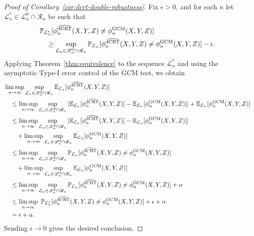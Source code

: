 \documentclass[aos]{imsart}
\theoremstyle{plain}
\theoremstyle{remark}
\newcommand{\E}{\mathbb E}								%
\renewcommand{\P}{\mathbb{P}}							%
\newcommand{\srx}{X}									%
\newcommand{\srz}{Z}									%
\newcommand{\sry}{Y}									%
\newcommand{\law}{\mathcal L}							%
\newcommand{\nulllaws}{\mathscr L^0}					%
\newcommand{\regclass}{\mathscr R}					    %
\newcommand{\GCM}{\textnormal{GCM}}						%
\newcommand{\dCRThat}{\widehat{\textnormal{dCRT}}}		%
\begin{document}
\begin{proof}[Proof of Corollary~\ref{cor:dcrt-double-robustness}] 
Fix $\epsilon > 0$, and for each $n$ let $\law^*_n \in \nulllaws_n \cap \regclass_n$ be such that
\begin{align*}
&\P_{\law^*_n}[\phi_n^{\dCRThat}(\srx, \sry, \srz) \neq \phi_n^{\GCM}(\srx, \sry, \srz)] \\
&\quad\geq \sup_{\law_n \in \nulllaws_n \cap \regclass_n} \P_{\law_n}[\phi_n^{\dCRThat}(\srx, \sry, \srz) \neq \phi_n^{\GCM}(\srx, \sry, \srz)] - \epsilon.
\end{align*}
Applying Theorem~\ref{thm:equivalence} to the sequence $\law^*_n$ and using the asymptotic Type-I error control of the GCM test, we obtain
\begin{equation*}
\begin{split}
&\limsup_{n \rightarrow \infty} \sup_{\law_n \in \nulllaws_n \cap \regclass_n} \E_{\law_n}[\phi_n^{\dCRThat}(\srx, \sry, \srz)] \\
&\quad\leq \limsup_{n \rightarrow \infty} \sup_{\law_n \in \nulllaws_n \cap \regclass_n} |\E_{\law_n}[\phi_n^{\dCRThat}(\srx, \sry, \srz)] - \E_{\law_n}[\phi_n^{\GCM}(\srx, \sry, \srz)]| + \E_{\law_n}[\phi_n^{\GCM}(\srx, \sry, \srz)] \\
&\quad\leq \limsup_{n \rightarrow \infty} \sup_{\law_n \in \nulllaws_n \cap  \regclass_n} |\E_{\law_n}[\phi_n^{\dCRThat}(\srx, \sry, \srz)] - \E_{\law_n}[\phi_n^{\GCM}(\srx, \sry, \srz)]| \\
&\quad \quad + \limsup_{n \rightarrow \infty} \sup_{\law_n \in \nulllaws_n \cap \regclass_n} \E_{\law_n}[\phi_n^{\GCM}(\srx, \sry, \srz)] \\
&\quad\leq \limsup_{n \rightarrow \infty} \sup_{\law_n \in \nulllaws_n \cap  \regclass_n} \P_{\law_n}[\phi_n^{\dCRThat}(\srx, \sry, \srz) \neq \phi_n^{\GCM}(\srx, \sry, \srz)]  \\
&\quad \quad + \limsup_{n \rightarrow \infty} \sup_{\law_n \in \nulllaws_n \cap \regclass_n} \E_{\law_n}[\phi_n^{\GCM}(\srx, \sry, \srz)] \\
&\quad\leq \limsup_{n \rightarrow \infty} \sup_{\law_n \in \nulllaws_n \cap  \regclass_n} \P_{\law_n}[\phi_n^{\dCRThat}(\srx, \sry, \srz) \neq \phi_n^{\GCM}(\srx, \sry, \srz)] + \alpha \\
&\quad\leq \limsup_{n \rightarrow \infty}\ \P_{\law^*_n}[\phi_n^{\dCRThat}(\srx, \sry, \srz) \neq \phi_n^{\GCM}(\srx, \sry, \srz)] + \epsilon +\alpha \\
&\quad=\epsilon + \alpha.
\end{split}
\end{equation*}
Sending $\epsilon \rightarrow 0$ gives the desired conclusion.
\end{proof}
\end{document}
